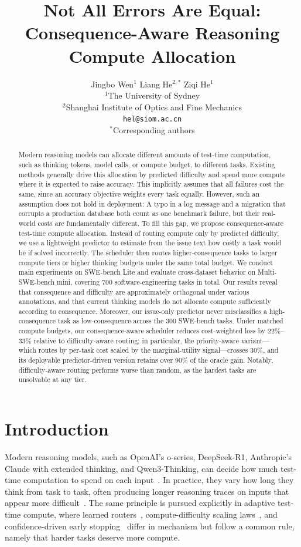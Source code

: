 \documentclass{article}
\title{Not All Errors Are Equal:\\Consequence-Aware Reasoning Compute Allocation}
\author{
Jingbo Wen$^{1}$ \quad
Liang He$^{2,\ast}$ \quad
Ziqi He$^{1}$ \\[4pt]
$^{1}$The University of Sydney \\
$^{2}$Shanghai Institute of Optics and Fine Mechanics \\[4pt]
\texttt{hel@siom.ac.cn} \\[2pt]
$^\ast$Corresponding authors
}
\begin{document}
\maketitle

\begin{abstract}
Modern reasoning models can allocate different amounts of test-time computation, such as thinking tokens, model calls, or compute budget, to different tasks. Existing methods generally drive this allocation by predicted difficulty and spend more compute where it is expected to raise accuracy. This implicitly assumes that all failures cost the same, since an accuracy objective weights every task equally. However, such an assumption does not hold in deployment: A typo in a log message and a migration that corrupts a production database both count as one benchmark failure, but their real-world costs are fundamentally different. To fill this gap,
we propose consequence-aware test-time compute allocation. Instead of routing compute only by predicted difficulty, we use a lightweight predictor to estimate from the issue text how costly a task would be if solved incorrectly. The scheduler then routes higher-consequence tasks to larger compute tiers or higher thinking budgets under the same total budget. We conduct main experiments on SWE-bench Lite and evaluate cross-dataset behavior on Multi-SWE-bench mini, covering
700 software-engineering tasks in total. Our results reveal that consequence and difficulty are approximately orthogonal under various annotations, and that current thinking models do not allocate compute sufficiently according to consequence. Moreover, our issue-only predictor never misclassifies a high-consequence task as low-consequence across the 300 SWE-bench tasks. Under matched compute budgets, our consequence-aware scheduler reduces cost-weighted loss by 22\%–33\% relative to difficulty-aware routing; in particular, the priority-aware variant---which routes by per-task cost scaled by the marginal-utility signal---crosses 30\%, and its deployable predictor-driven version retains over 90\% of the oracle gain. Notably, difficulty-aware routing performs worse than random, as the hardest tasks are unsolvable at any tier.
\end{abstract}

\section{Introduction}
\label{sec:intro}

Modern reasoning models, such as OpenAI's o-series, DeepSeek-R1,
Anthropic's Claude with extended thinking, and Qwen3-Thinking, can decide
how much test-time computation to spend on each input~\citep{li2025reasoningllms}. In practice, they
vary how long they think from task to task, often producing longer
reasoning traces on inputs that appear more difficult~\citep{alomrani2025reasoningbudget,zhu2025adaptivethinking}. The same principle
is pursued explicitly in adaptive test-time compute, where learned
routers~\citep{damani2024learning}, compute-difficulty scaling
laws~\citep{snell2024scaling}, and confidence-driven early
stopping~\citep{manvi2024adaptive} differ in mechanism but follow a common
rule, namely that harder tasks deserve more compute.
\end{document}
